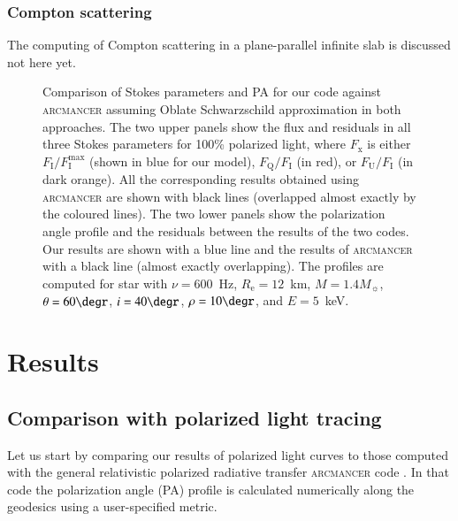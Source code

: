 \documentclass{aa}
\newcommand{\red}[1]{\textcolor{red}{#1}}
\newcommand{\blue}[1]{\textcolor{blue}{#1}}
\newcommand{\req}{R_{\mathrm{e}}}
\newcommand{\msun}{{M}_{\sun}}
\begin{document}
\subsubsection{Compton scattering}
The computing of Compton scattering in a plane-parallel infinite slab is discussed  not here yet.

\fi


\begin{figure}
\vspace*{-0.4cm}
\caption{
Comparison of Stokes parameters and PA for our code against \textsc{arcmancer} assuming Oblate Schwarzschild approximation in both approaches. 
The two upper panels show the flux and residuals in all three Stokes parameters for 100\% polarized light, where $F_{\mathrm{x}}$ is either $F_{\mathrm{I}}/F^{\mathrm{max}}_{\mathrm{I}}$ (shown in blue for our model), $F_{\mathrm{Q}}/F_{\mathrm{I}}$ (in red), or $F_{\mathrm{U}}/F_{\mathrm{I}}$ (in dark orange). 
All the corresponding results obtained using \textsc{arcmancer} are shown with black lines (overlapped almost exactly by the coloured lines). 
The two lower panels show the polarization angle profile and the residuals between the results of the two codes.
Our results are shown with a blue line and the results of \textsc{arcmancer} with a black line (almost exactly overlapping).
The profiles are computed for star with $\nu = 600$~Hz, $\req = 12$~km, $M = 1.4\msun$,
$\theta = 60\degr$, $i = 40\degr$, $\rho = 10 \degr$, and $E = 5$~keV. %
} 
\label{fig:arc_obl_obl}
\end{figure}

\section{Results}\label{sec:results}



\subsection{Comparison with polarized light tracing}
Let us start by comparing our results of polarized light curves to those computed with the general relativistic polarized radiative transfer \textsc{arcmancer} code \citep[see ][]{PMN18}.
In that code the polarization angle (PA) profile is calculated numerically along the geodesics using a user-specified metric.
\end{document}
